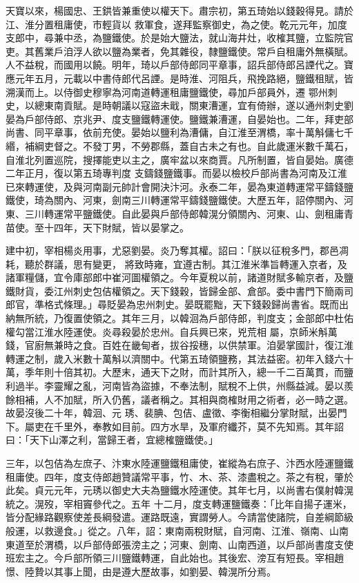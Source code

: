 \begin{pinyinscope}
 天寶以來，楊國忠、王鉷皆兼重使以權天下。肅宗初，第五琦始以錢穀得見。請於江、淮分置租庸使，市輕貨以
 救軍食，遂拜監察御史，為之使。乾元元年，加度支郎中，尋兼中丞，為鹽鐵使。於是始大鹽法，就山海井灶，收榷其鹽，立監院官吏。其舊業戶洎浮人欲以鹽為業者，免其雜役，隸鹽鐵使。常戶自租庸外無橫賦。人不益稅，而國用以饒。明年，琦以戶部侍郎同平章事，詔兵部侍郎呂諲代之。寶應元年五月，元載以中書侍郎代呂諲。是時淮、河阻兵，飛挽路絕，鹽鐵租賦，皆溯漢而上。以侍御史穆寧為河南道轉運租庸鹽鐵使，尋加戶部員外，遷
 鄂州刺史，以總東南貢賦。是時朝議以寇盜未戢，關東漕運，宜有倚辦，遂以通州刺史劉晏為戶部侍郎、京兆尹、度支鹽鐵轉運使。鹽鐵兼漕運，自晏始也。二年，拜吏部尚書、同平章事，依前充使。晏始以鹽利為漕傭，自江淮至渭橋，率十萬斛傭七千緡，補綱吏督之。不發丁男，不勞郡縣，蓋自古未之有也。自此歲運米數千萬石，自淮北列置巡院，搜擇能吏以主之，廣牢盆以來商賈。凡所制置，皆自晏始。廣德二年正月，復以第五琦專判度
 支鑄錢鹽鐵事。而晏以檢校戶部尚書為河南及江淮已來轉運使，及與河南副元帥計會開決汴河。永泰二年，晏為東道轉運常平鑄錢鹽鐵使，琦為關內、河東，劍南三川轉運常平鑄錢鹽鐵使。大歷五年，詔停關內、河東、三川轉運常平鹽鐵使。自此晏與戶部侍郎韓滉分領關內、河東、山、劍租庸青苗使。至十四年，天下財賦，皆以晏掌之。



 建中初，宰相楊炎用事，尤惡劉晏。炎乃奪其權。詔曰：「朕以征稅多門，郡邑凋耗，聽於群議，思有變更，
 將致時雍，宜遵古制。其江淮米準旨轉運入京者，及諸軍糧儲，宜令庫部郎中崔河圖權領之。今年夏稅以前，諸道財賦多輸京者，及鹽鐵財貨，委江州刺史包佶權領之。天下錢穀，皆歸金部、倉部。委中書門下簡兩司郎官，準格式條理。」尋貶晏為忠州刺史。晏既罷黜，天下錢穀歸尚書省。既而出納無所統，乃復置使領之。其年三月，以韓洄為戶部侍郎，判度支；金部郎中杜佑權勾當江淮水陸運使。炎尋殺晏於忠州。自兵興已來，兇荒相
 屬，京師米斛萬錢，官廚無兼時之食。百姓在畿甸者，拔谷挼穗，以供禁軍。洎晏掌國計，復江淮轉運之制，歲入米數十萬斛以濟關中。代第五琦領鹽務，其法益密。初年入錢六十萬，季年則十倍其初。大歷末，通天下之財，而計其所入，總一千二百萬貫，而鹽利過半。李靈耀之亂，河南皆為盜據，不奉法制，賦稅不上供，州縣益減。晏以羨餘相補，人不加賦，所入仍舊，議者稱之。其相與商榷財用之術者，必一時之選。故晏沒後二十年，韓洄、元
 琇、裴腆、包佶、盧徵、李衡相繼分掌財賦，出晏門下。屬吏在千里外，奉教如目前。四方水旱，及軍府纖芥，莫不先知焉。其年詔曰：「天下山澤之利，當歸王者，宜總榷鹽鐵使。」



 三年，以包佶為左庶子、汴東水陸運鹽鐵租庸使，崔縱為右庶子、汴西水陸運鹽鐵租庸使。四年，度支侍郎趙贊議常平事，竹、木、茶、漆盡稅之。茶之有稅，肇於此矣。貞元元年，元琇以御史大夫為鹽鐵水陸運使。其年七月，以尚書右僕射韓滉統之。滉歿，宰相竇參代之。五年
 十二月，度支轉運鹽鐵奏：「比年自揚子運米，皆分配緣路觀察使差長綱發遣。運路既遠，實謂勞人。今請當使諸院，自差綱節級般運，以救邊食。」從之。八年，詔：東南兩稅財賦，自河南、江淮、嶺南、山南東道至於渭橋，以戶部侍郎張滂主之；河東、劍南、山南西道，以戶部尚書度支使班宏主之。今戶部所領三川鹽鐵轉運，自此始也。其後宏、滂互有短長。宰相趙憬、陸贄以其事上聞，由是遵大歷故事，如劉晏、韓滉所分焉。




\end{pinyinscope}
